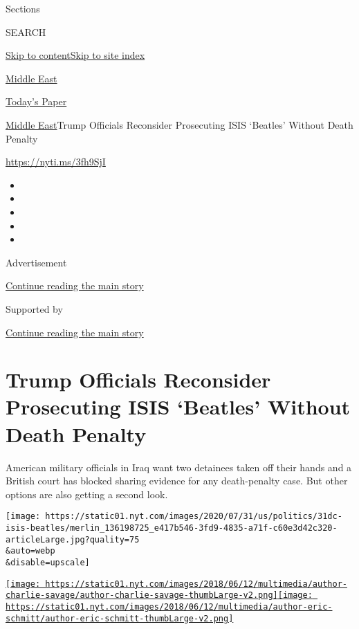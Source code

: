 Sections

SEARCH

\protect\hyperlink{site-content}{Skip to
content}\protect\hyperlink{site-index}{Skip to site index}

\href{https://www.nytimes.com/section/world/middleeast}{Middle East}

\href{https://myaccount.nytimes.com/auth/login?response_type=cookie\&client_id=vi}{}

\href{https://www.nytimes.com/section/todayspaper}{Today's Paper}

\href{/section/world/middleeast}{Middle East}\textbar{}Trump Officials
Reconsider Prosecuting ISIS `Beatles' Without Death Penalty

\url{https://nyti.ms/3fh9SjI}

\begin{itemize}
\item
\item
\item
\item
\item
\end{itemize}

Advertisement

\protect\hyperlink{after-top}{Continue reading the main story}

Supported by

\protect\hyperlink{after-sponsor}{Continue reading the main story}

\hypertarget{trump-officials-reconsider-prosecuting-isis-beatles-without-death-penalty}{%
\section{Trump Officials Reconsider Prosecuting ISIS `Beatles' Without
Death
Penalty}\label{trump-officials-reconsider-prosecuting-isis-beatles-without-death-penalty}}

American military officials in Iraq want two detainees taken off their
hands and a British court has blocked sharing evidence for any
death-penalty case. But other options are also getting a second look.

\texttt{[image: https://static01.nyt.com/images/2020/07/31/us/politics/31dc-isis-beatles/merlin\_136198725\_e417b546-3fd9-4835-a71f-c60e3d42c320-articleLarge.jpg?quality=75\\\&auto=webp\\\&disable=upscale]}

\href{https://www.nytimes.com/by/charlie-savage}{\texttt{[image: https://static01.nyt.com/images/2018/06/12/multimedia/author-charlie-savage/author-charlie-savage-thumbLarge-v2.png]}}\href{https://www.nytimes.com/by/eric-schmitt}{\texttt{[image: https://static01.nyt.com/images/2018/06/12/multimedia/author-eric-schmitt/author-eric-schmitt-thumbLarge-v2.png]}}

